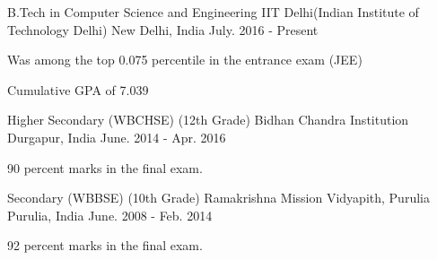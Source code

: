 

\begin{cventries}

  \cventry
    {B.Tech in Computer Science and Engineering} %
    {IIT Delhi(Indian Institute of Technology Delhi)} %
    {New Delhi, India} %
    {July. 2016 - Present} %
    {
      \begin{cvitems} %
        \item {Was among the top 0.075 percentile in the entrance exam (JEE)}
        \item {Cumulative GPA of 7.039}
      \end{cvitems}
    }

  \cventry
    {Higher Secondary (WBCHSE) (12th Grade)} %
    {Bidhan Chandra Institution} %
    {Durgapur, India} %
    {June. 2014 - Apr. 2016} %
    {
      \begin{cvitems} %
        \item {90 percent marks in the final exam.}
      \end{cvitems}
    }

  \cventry
    {Secondary (WBBSE) (10th Grade)} %
    {Ramakrishna Mission Vidyapith, Purulia} %
    {Purulia, India} %
    {June. 2008 - Feb. 2014} %
    {
      \begin{cvitems} %
        \item {92 percent marks in the final exam.}
      \end{cvitems}
    }


\end{cventries}
